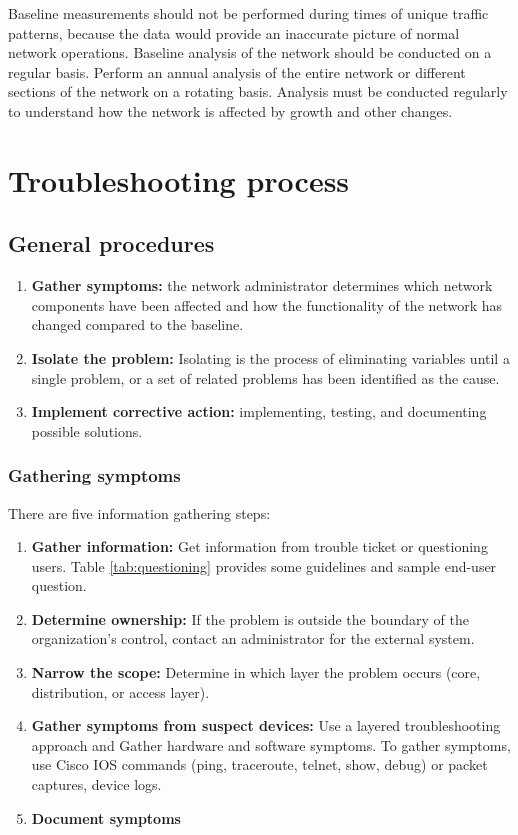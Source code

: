 Baseline measurements should not be performed during times of unique traffic patterns, because the data would provide an inaccurate picture of normal network operations. Baseline analysis of the network should be conducted on a regular basis. Perform an annual analysis of the entire network or different sections of the network on a rotating basis. Analysis must be conducted regularly to understand how the network is affected by growth and other changes.

\section{Troubleshooting process}

\subsection{General procedures}

\begin{enumerate}
\item \textbf{Gather symptoms:} the network administrator determines which network components have been affected and how the functionality of the network has changed compared to the baseline.
\item \textbf{Isolate the problem:}  Isolating is the process of eliminating variables until a single problem, or a set of related problems has been identified as the cause.
\item \textbf{Implement corrective action:} implementing, testing, and documenting possible solutions.
\end{enumerate}

\subsubsection{Gathering symptoms}

There are five information gathering steps:

\begin{enumerate}
\item \textbf{Gather information:} Get information from trouble ticket or questioning users. Table \ref{tab:questioning} provides some guidelines and sample end-user question.
\item \textbf{Determine ownership:} If the problem is outside the boundary of the organization's control, contact an administrator for the external system.
\item \textbf{Narrow the scope:} Determine in which layer the problem occurs (core, distribution, or access layer).
\item \textbf{Gather symptoms from suspect devices:} Use a layered troubleshooting approach and Gather hardware and software symptoms. To gather symptoms, use Cisco IOS commands (ping, traceroute, telnet, show, debug) or packet captures, device logs.
\item \textbf{Document symptoms} 
\end{enumerate}

